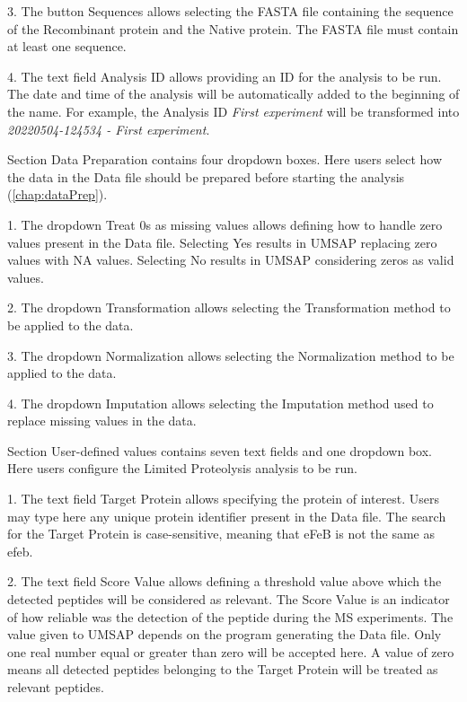 \num{3}. The button Sequences allows selecting the
FASTA file containing the sequence of the Recombinant protein and the Native protein.
The FASTA file must contain at least one sequence.

\num{4}. The text field Analysis ID allows providing an ID for the analysis
to be run. The date and time of the analysis will be automatically added to the
beginning of the name. For example, the Analysis ID \textit{First experiment} will
be transformed into \textit{20220504-124534 - First experiment}.

Section Data Preparation contains four dropdown boxes. Here users select how the data
in the Data file should be prepared before starting the analysis (\autoref{chap:dataPrep}).

\num{1}. The dropdown Treat \num{0}s as missing values allows defining how
to handle zero values present in the Data file. Selecting Yes results in UMSAP
replacing zero values with NA values. Selecting No results in UMSAP considering
zeros as valid values.

\num{2}. The dropdown Transformation allows selecting the Transformation method
to be applied to the data.

\num{3}. The dropdown Normalization allows selecting the Normalization method
to be applied to the data.

\num{4}. The dropdown Imputation allows selecting the Imputation method used
to replace missing values in the data.

Section User-defined values contains seven text fields and one dropdown box. Here
users configure the Limited Proteolysis analysis to be run.

\num{1}. The text field Target Protein\label{par:limprotTargetProtein} allows
specifying the protein of interest. Users may type here any unique protein identifier
present in the Data file. The search for the Target Protein is case-sensitive, meaning
that eFeB is not the same as efeb.

\num{2}. The text field Score Value\label{par:limprotScoreValue} allows
defining a threshold value above which the detected peptides will be considered as
relevant. The Score Value is an indicator of how reliable was the detection of the peptide
during the MS experiments. The value given to UMSAP depends on the program generating
the Data file. Only one real number equal or greater than zero will be accepted here.
A value of zero means all detected peptides belonging to the Target Protein will
be treated as relevant peptides.

